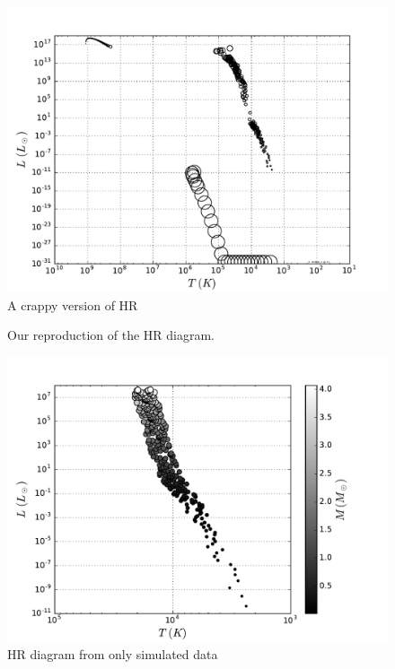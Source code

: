\documentclass[10pt]{article}
\begin{document}
\begin{figure}[p]
\begin{centering}
\includegraphics[width=\textwidth]{new_bad_hr.pdf}
\caption{A crappy version of HR}
\label{fig:nosobadHR}
\end{centering}
\end{figure}

\begin{figure}[p]
\begin{centering}

\caption{Our reproduction of the HR diagram.}
\label{fig:HR}
\end{centering}
\end{figure}

\begin{figure}[p]
\begin{centering}
\includegraphics[width=\textwidth]{extra_hr.pdf}
\caption{HR diagram from only simulated data}
\label{fig:extraHR}
\end{centering}
\end{figure}
\end{document}
